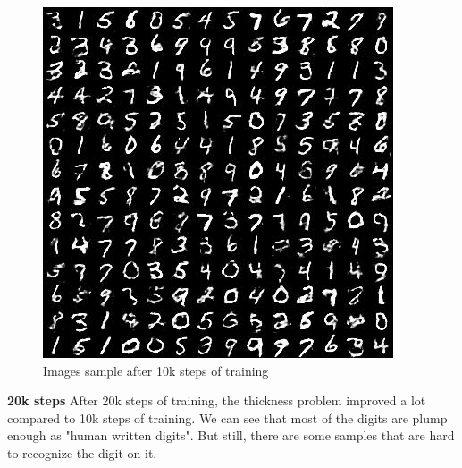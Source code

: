 \begin{figure}[ht]
\begin{center}
\includegraphics[width=\columnwidth]{figures/sample_0050}
\caption{\label{sample50} Images sample after 10k steps of training}
\end{center}
\vspace{-0.45cm}
\end{figure}

\newpage

\textbf{20k steps}
After 20k steps of training, the thickness problem improved a lot compared to 10k steps of training. We can see that most of the digits are plump enough as "human written digits". But still, there are some samples that are hard to recognize the digit on it.

